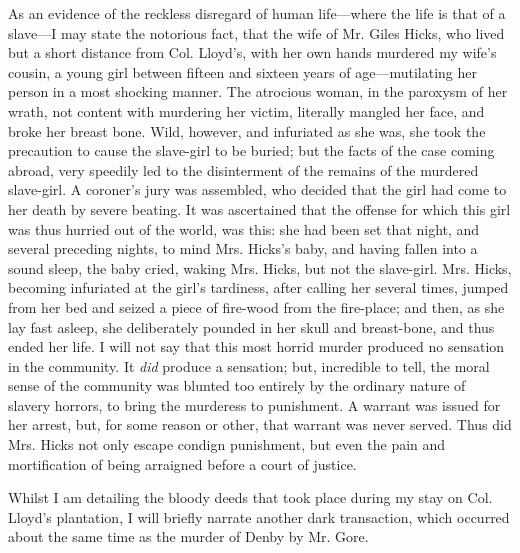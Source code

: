 As an evidence of the reckless disregard of human life---where the life
is that of a slave---I may state the notorious fact, that the wife of
Mr. Giles Hicks, who lived but a short distance from Col. Lloyd's, with
her own hands murdered my wife's cousin, a young girl between fifteen
and sixteen years of age---mutilating her person in a most shocking
manner. The atrocious woman, in the paroxysm of her wrath, not content
with murdering her victim, literally mangled her face, and broke her
breast bone. Wild, however, and infuriated as she was, she took the
precaution to cause the slave-girl to be buried; but the facts of the
case coming abroad, very speedily led to the disinterment of the remains
of the murdered slave-girl. A coroner's jury was assembled, who decided
that the girl had come to her death by severe beating. It was
ascertained that the offense for which this girl was thus hurried out of
the world, was this: she had been set that night, and several preceding
nights, to mind Mrs. Hicks's baby, and having fallen into a sound sleep,
the baby cried, waking Mrs. Hicks, but not the slave-girl. Mrs. Hicks,
becoming infuriated at the girl's tardiness, after calling her several
times, jumped from her bed and seized a piece of fire-wood from the
{\protect\hypertarget{126}{}{}}fire-place; and then, as she lay fast
asleep, she deliberately pounded in her skull and breast-bone, and thus
ended her life. I will not say that this most horrid murder produced no
sensation in the community. It \emph{did} produce a sensation; but,
incredible to tell, the moral sense of the community was blunted too
entirely by the ordinary nature of slavery horrors, to bring the
murderess to punishment. A warrant was issued for her arrest, but, for
some reason or other, that warrant was never served. Thus did Mrs. Hicks
not only escape condign punishment, but even the pain and mortification
of being arraigned before a court of justice.

Whilst I am detailing the bloody deeds that took place during my stay on
Col. Lloyd's plantation, I will briefly narrate another dark
transaction, which occurred about the same time as the murder of Denby
by Mr. Gore.

